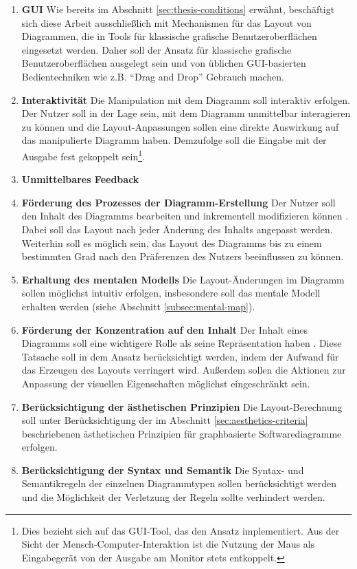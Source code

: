 \begin{enumerate}[label={K.\arabic*}]
    \item \label{req:gui} \textbf{GUI} Wie bereits im Abschnitt \ref{sec:thesis-conditions} erwähnt, beschäftigt sich diese Arbeit ausschließlich mit Mechanismen für das Layout von Diagrammen, die in Tools für klassische grafische Benutzeroberflächen eingesetzt werden. Daher soll der Ansatz für klassische grafische Benutzeroberflächen ausgelegt sein und von üblichen GUI-basierten Bedientechniken wie z.B. \enquote{Drag and Drop} Gebrauch machen.
    \item \label{req:interactivity} \textbf{Interaktivität} Die Manipulation mit dem Diagramm soll interaktiv erfolgen. Der Nutzer soll in der Lage sein, mit dem Diagramm unmittelbar interagieren zu können und die Layout-Anpassungen sollen eine direkte Auswirkung auf das manipulierte Diagramm haben. Demzufolge soll die Eingabe mit der Ausgabe fest gekoppelt sein\footnote{Dies bezieht sich auf das GUI-Tool, das den Ansatz implementiert. Aus der Sicht der Mensch-Computer-Interaktion ist die Nutzung der Maus als Eingabegerät von der Ausgabe am Monitor stets entkoppelt.}.
    
    \item \label{req:immediate-feedback} \textbf{Unmittelbares Feedback} \cite[S.69]{Wybrow08Using}
    
    \item \label{req:editing-support} \textbf{Förderung des Prozesses der Diagramm-Erstellung} Der Nutzer soll den Inhalt des Diagramms bearbeiten und inkrementell modifizieren können \cite{GladischSchumann14Semi-Automatic}. Dabei soll das Layout nach jeder Änderung des Inhalts angepasst werden. Weiterhin soll es möglich sein, das Layout des Diagramms bis zu einem bestimmten Grad nach den Präferenzen des Nutzers beeinflussen zu können.
    \item \label{req:mental-map} \textbf{Erhaltung des mentalen Modells} Die Layout-Änderungen im Diagramm sollen möglichst intuitiv erfolgen, insbesondere soll das mentale Modell erhalten werden (siehe Abschnitt \ref{subsec:mental-map}).
    \item \label{req:focus-on-the-content} \textbf{Förderung der Konzentration auf den Inhalt} Der Inhalt eines Diagramms soll eine wichtigere Rolle als seine Repräsentation haben \cite[S.38ff]{Ambler02Agile}. Diese Tatsache soll in dem Ansatz berücksichtigt werden, indem der Aufwand für das Erzeugen des Layouts verringert wird. Außerdem sollen die Aktionen zur Anpassung der visuellen Eigenschaften möglichst eingeschränkt sein.
    \item \label{req:aesthetics-criteria} \textbf{Berücksichtigung der ästhetischen Prinzipien} Die Layout-Berechnung soll unter Berücksichtigung der im Abschnitt \ref{sec:aesthetics-criteria} beschriebenen ästhetischen Prinzipien für graphbasierte Softwarediagramme erfolgen.
    \item \label{req:syntax-and-semantics} \textbf{Berücksichtigung der Syntax und Semantik} Die Syntax- und Semantikregeln der einzelnen Diagrammtypen sollen berücksichtigt werden und die Möglichkeit der Verletzung der Regeln sollte verhindert werden.
       

\end{enumerate}
